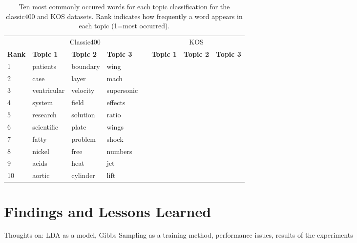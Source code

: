 \documentclass[10pt]{article}
\newcommand{\ra}[1]{\renewcommand{\arraystretch}{#1}}
\begin{document}
\begin{table}
	\centering
    \ra{1.2}
	\begin{tabular}{@{} l l l l c l l l @{}}
        \toprule
        & \multicolumn{3}{c}{Classic400} & \phantom{abc} & \multicolumn{3}{c}{KOS}\\
        \cmidrule{2-4} \cmidrule{6-8}
        \bf{Rank} & \bf{Topic 1} & \bf{Topic 2} & \bf{Topic 3} && \bf{Topic 1} & \bf{Topic 2} & \bf{Topic 3} \\
        \midrule
         1 & patients     & boundary     & wing         && & & \\
         2 & case         & layer        & mach         && & & \\
         3 & ventricular  & velocity     & supersonic   && & & \\
         4 & system       & field        & effects      && & & \\
         5 & research     & solution     & ratio        && & & \\
         6 & scientific   & plate        & wings        && & & \\
         7 & fatty        & problem      & shock        && & & \\
         8 & nickel       & free         & numbers      && & & \\
         9 & acids        & heat         & jet          && & & \\
        10 & aortic       & cylinder     & lift         && & & \\
        \bottomrule
	\end{tabular}
	\caption{Ten most commonly occured words for each topic classification for the classic400 and KOS datasets. Rank indicates how frequently a word appears in each topic (1=most occurred).}
	\label{tab:common_classic400}
\end{table}



\section{Findings and Lessons Learned}
\label{sec:conclusion}

Thoughts on: LDA as a model, Gibbs Sampling as a training method, performance issues, results of the experiments




\end{document}
